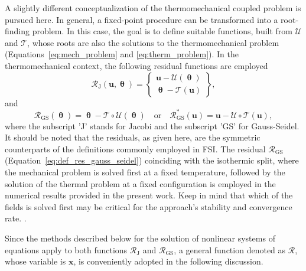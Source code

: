 A slightly different conceptualization of the thermomechanical coupled problem is pursued here.
In general, a fixed-point procedure can be transformed into a root-finding problem.
In this case, the goal is to define suitable functions, built from \(\bm{\mathcal{U}}\) and \(\bm{\mathcal{T}}\), whose roots are also the solutions to the thermomechanical problem (Equations~\eqref{eq:mech_problem} and \eqref{eq:therm_problem}).
In the thermomechanical context, the following residual functions  are employed
\begin{equation} \label{eq:def_res_jacobi}
  \bm{\mathcal{R}}_\text{J}(\mathbf{u}, \bm{\uptheta}) =
  \left\{\begin{array}{c}
           \mathbf{u} - \bm{\mathcal{U}}(\bm{\uptheta})\\
           \bm{\uptheta} - \bm{\mathcal{T}}(\mathbf{u})
         \end{array}\right\},
     \end{equation}
     and
     \begin{equation} \label{eq:def_res_gauss_seidel}
       \bm{\mathcal{R}}_\text{GS}(\bm{\uptheta}) =
       \bm{\uptheta} - \bm{\mathcal{T}}\circ \bm{\mathcal{U}}(\bm{\uptheta}) \quad \text{or} \quad \bm{\mathcal{R}}^*_\text{GS}(\mathbf{u}) =
       \mathbf{u} - \bm{\mathcal{U}}\circ \bm{\mathcal{T}}(\mathbf{u}),
     \end{equation}
     where the subscript 'J' stands for Jacobi and the subscript 'GS' for Gauss-Seidel.
     It should be noted that the residuals, as given here, are the symmetric counterparts of the definitions commonly employed in FSI.
    The residual \(\bm{\mathcal{R}}_\text{GS}\) (Equation~\eqref{eq:def_res_gauss_seidel}) coinciding with the isothermic split, where the mechanical problem is solved first at a fixed temperature, followed by the solution of the thermal problem at a fixed configuration is employed in the numerical results provided in the present work.
    Keep in mind that which of the fields is solved first may be critical for the approach's stability and convergence rate.  \citep{joosten_analysis_2009}.

     Since the methods described below for the solution of nonlinear systems of equations apply to both functions \(\bm{\mathcal{R}}_\mathrm{J}\) and \(\bm{\mathcal{R}}_\mathrm{GS}\), a general function denoted as \(\bm{\mathcal{R}}\), whose variable is \(\mathbf{x}\), is conveniently adopted in the following discussion.

